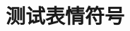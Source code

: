 \chapter{测试表情符号} %
\label{cha:测试表情符号}
	\Innocey\Strichmaxerl\Candle\Coffeecup
	\Cooley
	\Tongey\Nursey\Vomey\Walley\Cat\Sadey[][red]
	\dInnocey
